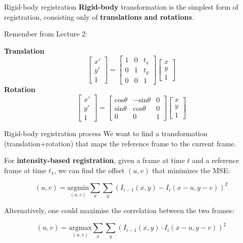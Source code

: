 \documentclass[9pt, aspectratio=169]{beamer}
\begin{document}
\begin{frame}
    {Rigid-body registration}
    \textbf{Rigid-body} transformation is the simplest form of registration, consisting only of \textbf{translations and rotations}.

    Remember from Lecture 2:

    \centering
    \textbf{Translation}
    $$\begin{bmatrix}x'\\y'\\1\end{bmatrix} = \begin{bmatrix}1&0&t_x\\0&1&t_y\\0&0&1\end{bmatrix}\begin{bmatrix}x\\y\\1\end{bmatrix}$$
    \textbf{Rotation}
    $$\begin{bmatrix}x'\\y'\\1\end{bmatrix} = \begin{bmatrix}\text{cos}\theta&-\text{sin}\theta&0\\\text{sin}\theta&\text{cos}\theta&0\\0&0&1\end{bmatrix}\begin{bmatrix}x\\y\\1\end{bmatrix}$$
\end{frame}

\begin{frame}
    {Rigid-body registration process}
    We want to find a transformation (translation+rotation) that maps the reference frame to the current frame.

    For \textbf{intensity-based registration}, given a frame at time $t$ and a reference frame at time $t_1$, we can find the offset $(u,v)$ that minimizes the MSE:

    \Large
    $$(u,v) = \underset{(u,v)}{\text{argmin}}\sum_x\sum_y(I_{i-1}(x,y)-I_{i}(x-u, y-v))^2$$

    \normalsize
    Alternatively, one could maximise the correlation between the two frames:

    \Large
    $$(u,v) = \underset{(u,v)}{\text{argmax}}\sum_x\sum_y(I_{i-1}(x,y)\cdot I_{i}(x-u, y-v))^2$$
\end{frame}
\end{document}
